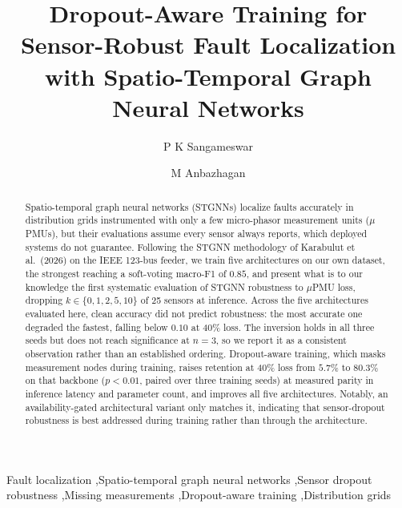 \documentclass[3p,times,procedia]{elsarticle}
\begin{document}
\begin{frontmatter}


\title{Dropout-Aware Training for Sensor-Robust Fault Localization with Spatio-Temporal Graph Neural Networks}

\author[1]{P K Sangameswar}
\author[1]{M Anbazhagan}

\address[1]{Department of Computer Science and Engineering, Amrita School of Computing, Coimbatore, Amrita Vishwa Vidyapeetham, India}

\begin{abstract}
Spatio-temporal graph neural networks (STGNNs) localize faults accurately in distribution grids instrumented with only a few micro-phasor measurement units ($\mu$PMUs), but their evaluations assume every sensor always reports, which deployed systems do not guarantee. Following the STGNN methodology of Karabulut et al.\ (2026) on the IEEE 123-bus feeder, we train five architectures on our own dataset, the strongest reaching a soft-voting macro-F1 of $0.85$, and present what is to our knowledge the first systematic evaluation of STGNN robustness to $\mu$PMU loss, dropping $k \in \{0,1,2,5,10\}$ of 25 sensors at inference. Across the five architectures evaluated here, clean accuracy did not predict robustness: the most accurate one degraded the fastest, falling below $0.10$ at 40\% loss. The inversion holds in all three seeds but does not reach significance at $n=3$, so we report it as a consistent observation rather than an established ordering. Dropout-aware training, which masks measurement nodes during training, raises retention at 40\% loss from $5.7\%$ to $80.3\%$ on that backbone ($p<0.01$, paired over three training seeds) at measured parity in inference latency and parameter count, and improves all five architectures. Notably, an availability-gated architectural variant only matches it, indicating that sensor-dropout robustness is best addressed during training rather than through the architecture.
\end{abstract}

\begin{keyword}
Fault localization \sep Spatio-temporal graph neural networks \sep Sensor dropout robustness \sep Missing measurements \sep Dropout-aware training \sep Distribution grids
\end{keyword}

\end{frontmatter}
\end{document}

